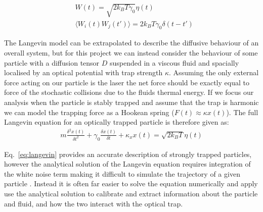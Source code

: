 \documentclass[a4paper,oneside,11pt]{book}
\begin{document}
\begin{align}
	&W(t) = \sqrt{2k_BT\gamma_0}\eta(t) \\
	&\langle W_i(t)W_j(t')\rangle = 2k_BT\gamma_0\delta(t-t')
\end{align}

The Langevin model can be extrapolated to describe the diffusive behaviour of an overall system, but for this project we can instead consider the behaviour of some particle with a diffusion tensor $D$ suspended in a viscous fluid and spacially localised by an optical potential with trap strength $\kappa$. Assuming the only external force acting on our particle is the laser the net force should be exactly equal to force of the stochastic collisions due to the fluids thermal energy. If we focus our analysis when the particle is stably trapped and assume that the trap is harmonic we can model the trapping force as a Hookean spring ($F(t) \approx \kappa x(t)$). The full Langevin equation for an optically trapped particle is therefore given as:
\begin{align}
	\label{eq:langevin}
	m\frac{\delta^2x(t)}{\delta t^2} + \gamma_0 \frac{\delta x(t)}{\delta t} + \kappa_x x(t) = \sqrt{2k_BT}\eta(t)
\end{align}

Eq.~\ref{eq:langevin} provides an accurate description of strongly trapped particles, however the analytical solution of the Langevin equation requires integration of the white noise term making it difficult to simulate the trajectory of a given particle \cite{Volpe2013}. Instead it is often far easier to solve the equation numerically and apply use the analytical solution to calibrate and extract information about the particle and fluid, and how the two interact with the optical trap.
\end{document}
